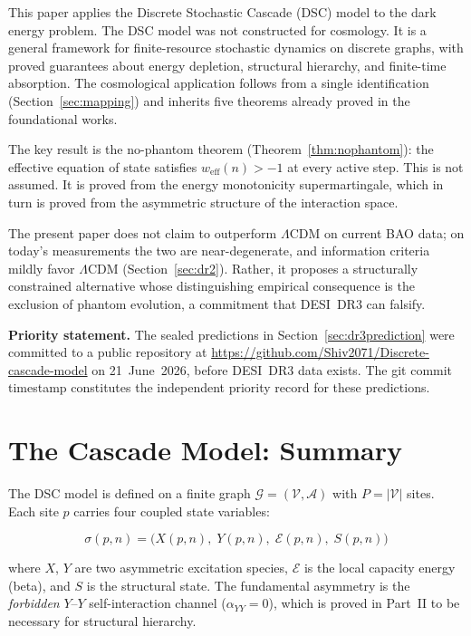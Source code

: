 \documentclass[12pt,a4paper]{article}
\theoremstyle{plain}
\theoremstyle{definition}
\newcommand{\weff}{w_{\mathrm{eff}}}
\begin{document}
This paper applies the Discrete Stochastic Cascade (DSC) model
\cite{goswami_part1,goswami_part2} to the dark energy problem. The DSC model was
not constructed for cosmology. It is a general framework for finite-resource
stochastic dynamics on discrete graphs, with proved guarantees about energy
depletion, structural hierarchy, and finite-time absorption. The cosmological
application follows from a single identification (Section~\ref{sec:mapping})
and inherits five theorems already proved in the foundational works.

The key result is the no-phantom theorem (Theorem~\ref{thm:nophantom}): the
effective equation of state satisfies $\weff(n) > -1$ at every active step.
This is not assumed. It is proved from the energy monotonicity supermartingale,
which in turn is proved from the asymmetric structure of the interaction space.

The present paper does not claim to outperform $\Lambda$CDM on current BAO
data; on today's measurements the two are near-degenerate, and information
criteria mildly favor $\Lambda$CDM (Section~\ref{sec:dr2}). Rather, it proposes
a structurally constrained alternative whose distinguishing empirical
consequence is the exclusion of phantom evolution, a commitment that DESI~DR3
can falsify.

\medskip
\noindent\textbf{Priority statement.} The sealed predictions in
Section~\ref{sec:dr3prediction} were committed to a public repository at
\url{https://github.com/Shiv2071/Discrete-cascade-model} on 21~June~2026, before
DESI~DR3 data exists. The git commit timestamp constitutes the independent priority
record for these predictions.

\section{The Cascade Model: Summary}
\label{sec:model}

The DSC model is defined on a finite graph $\mathcal{G} = (\mathcal{V},\mathcal{A})$
with $P = |\mathcal{V}|$ sites. Each site $p$ carries four coupled state variables:

\[
\sigma(p,n) = \bigl(X(p,n),\; Y(p,n),\; \mathcal{E}(p,n),\; S(p,n)\bigr)
\]

where $X$, $Y$ are two asymmetric excitation species, $\mathcal{E}$ is the local
capacity energy (beta), and $S$ is the structural state. The fundamental asymmetry
is the \emph{forbidden} $Y$--$Y$ self-interaction channel ($\alpha_{YY} = 0$),
which is proved in Part~II \cite{goswami_part2} to be necessary for structural
hierarchy.
\end{document}

